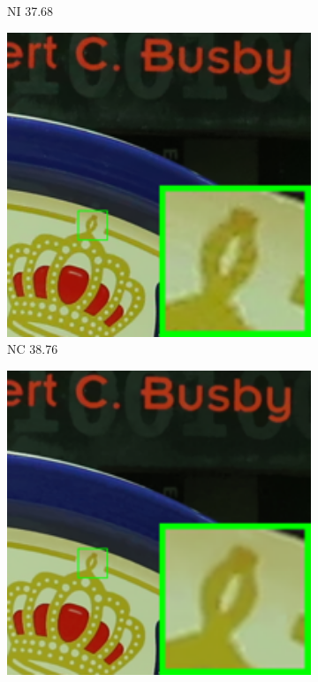 \begin{figure}
\begin{subfigure}[t]{0.19\textwidth}
		\caption{NI 37.68}
    \end{subfigure}
    \hfill
    \begin{subfigure}[t]{0.19\textwidth}
        \centering
        \includegraphics[width=1\textwidth]{images/guided/resize_br_NC_5dmark3_iso3200_1_real.png}
		\caption{NC 38.76}
    \end{subfigure}
    \hfill
    \begin{subfigure}[t]{0.19\textwidth}
        \centering
        \includegraphics[width=1\textwidth]{images/guided/resize_br_CCNoise_5dmark3_iso3200_1.png}

\end{subfigure}
\end{figure}
